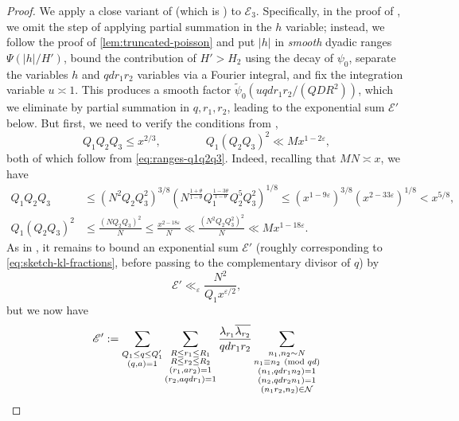 \documentclass[reqno,11pt]{amsart}
\theoremstyle{remark}
\numberwithin{equation}{section}
\newcommand{\msE}{\mathscr{E}}
\newcommand{\mN}{\mathcal{N}}
\newcommand{\eps}{\varepsilon}
\renewcommand{\bar}{\overline}
\renewcommand{\tilde}{\widetilde}
\renewcommand{\pmod}[1]{\ (\textnormal{mod } #1)}
\begin{document}
\begin{proof}
We apply a close variant of \cite[Lemma 5.9]{maynard2025primes2} (which is \cite[Lemma 14.5]{maynard2025primes}) to $\msE_3$. Specifically, in the proof of \cite[Lemma 14.5]{maynard2025primes}, we omit the step of applying partial summation in the $h$ variable; instead, we follow the proof of \cref{lem:truncated-poisson} and put $|h|$ in \emph{smooth} dyadic ranges $\Psi(|h|/H')$, bound the contribution of $H' > H_2$ using the decay of $\psi_0$, separate the variables $h$ and $q d r_1 r_2$ variables via a Fourier integral, and fix the integration variable $u \asymp 1$. This produces a smooth factor $\tilde\psi_0(u q d r_1 r_2 / (QDR^2))$, which we eliminate by partial summation in $q, r_1, r_2$, leading to the exponential sum $\msE'$ below. But first, we need to verify the conditions \cite[(5.1), (5.2)]{maynard2025primes2} from \cite[Lemma 5.9]{maynard2025primes2}, 
\[
    Q_1 Q_2 Q_3 \le x^{2/3},
    \qquad \qquad
    Q_1 (Q_2 Q_3)^2 \ll M x^{1-2\eps},
\]
both of which follow from \cref{eq:ranges-q1q2q3}. Indeed, recalling that $MN \asymp x$, we have
\begin{equation} \label{eq:primes-easy-bounds}
\begin{aligned}
    Q_1 Q_2 Q_3 &\le \left(N^2 Q_2 Q_3^2\right)^{3/8} \left(N^{\frac{1+\theta}{1-\theta}} Q_1^{\frac{1-3\theta}{1-\theta}} Q_2^5 Q_3^2\right)^{1/8}
    \le 
    \left(x^{1-9\eps}\right)^{3/8} \left(x^{2-33\eps}\right)^{1/8}
    < x^{5/8},
    \\
    Q_1 (Q_2 Q_3)^2 &\le \frac{\left(N Q_2 Q_3\right)^2}{N}
    \le 
    \frac{x^{2-18\eps}}{N}
    \ll
    \frac{\left(N^2 Q_2 Q_3^2\right)^2}{N} \ll M x^{1-18\eps}.
\end{aligned}
\end{equation}
As in \cite[p.\,27]{maynard2025primes2}, it remains to bound an exponential sum $\msE'$ (roughly corresponding to \cref{eq:sketch-kl-fractions}, before passing to the complementary divisor of $q$) by 
\begin{equation} \label{eq:primes-expo-to-bound}
    \msE' \ll_\eps \frac{N^2}{Q_1 x^{\eps/2}},
\end{equation}
but we now have
\[
    \msE' := 
    \sum_{\substack{Q_1 \le q \le Q_1' \\ (q, a) = 1}}
    \sum_{\substack{R \le r_1 \le R_1 \\ R \le r_2 \le R_2 \\ (r_1, ar_2) = 1 \\ (r_2, aqdr_1) = 1}}
    \frac{\lambda_{r_1} \bar{\lambda_{r_2}}}{qdr_1 r_2}
    \sum_{\substack{n_1, n_2 \sim N \\ n_1 \equiv n_2 \pmod{qd} \\ (n_1, qdr_1n_2) = 1 \\ (n_2, qdr_2 n_1) = 1 \\ (n_1 r_2, n_2) \in \mN}}
\]
\end{proof}
\end{document}
